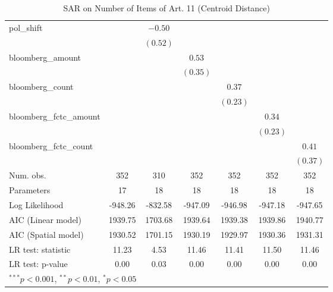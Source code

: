 \begin{table}[!h]
\begin{center}
\begin{tabular}{l c c c c c c }
pol\_shift              &              & $-0.50$     &              &              &              &              \\
                        &              & $(0.52)$    &              &              &              &              \\
bloomberg\_amount       &              &             & $0.53$       &              &              &              \\
                        &              &             & $(0.35)$     &              &              &              \\
bloomberg\_count        &              &             &              & $0.37$       &              &              \\
                        &              &             &              & $(0.23)$     &              &              \\
bloomberg\_fctc\_amount &              &             &              &              & $0.34$       &              \\
                        &              &             &              &              & $(0.23)$     &              \\
bloomberg\_fctc\_count  &              &             &              &              &              & $0.41$       \\
                        &              &             &              &              &              & $(0.37)$     \\
\midrule
Num. obs.               & 352          & 310         & 352          & 352          & 352          & 352          \\
Parameters              & 17           & 18          & 18           & 18           & 18           & 18           \\
Log Likelihood          & -948.26      & -832.58     & -947.09      & -946.98      & -947.18      & -947.65      \\
AIC (Linear model)      & 1939.75      & 1703.68     & 1939.64      & 1939.38      & 1939.86      & 1940.77      \\
AIC (Spatial model)     & 1930.52      & 1701.15     & 1930.19      & 1929.97      & 1930.36      & 1931.31      \\
LR test: statistic      & 11.23        & 4.53        & 11.46        & 11.41        & 11.50        & 11.46        \\
LR test: p-value        & 0.00         & 0.03        & 0.00         & 0.00         & 0.00         & 0.00         \\
\bottomrule
\multicolumn{7}{l}{\scriptsize{$^{***}p<0.001$, $^{**}p<0.01$, $^*p<0.05$}}
\end{tabular}
\caption{SAR on Number of Items of Art. 11 (Centroid Distance)}
\label{table:coefficients}
\end{center}
\end{table}
